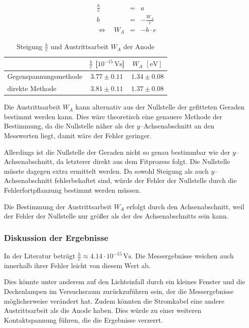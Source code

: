 \documentclass[12pt,a4paper]{scrartcl}
\numberwithin{equation}{section} %
\begin{document}
\begin{eqnarray}
	\frac{h}{e} &=& a \label{eq:h/e Steigung} \\
	b &=& - \frac{W_A}{e} \label{eq:h/e Achsenabschnitt} \\
	\Leftrightarrow \quad W_A &=& - b \cdot e
\end{eqnarray}

\begin{table}[h!]
	\centering
	\begin{tabular}{l|c|c}
		& $\frac{h}{e}$ [$10^{-15} \mathrm{\, Vs}$] & $W_A$ $[\mathrm{eV}]$ \\
		\hline
		Gegenspannungsmethode & $3.77 \pm 0.11$ & $1.34 \pm 0.08$ \\
		direkte Methode & $3.81 \pm 0.11$ & $1.37 \pm 0.08$
	\end{tabular}
	\caption{Steigung $\frac{h}{e}$ und Austrittsarbeit $W_A$ der Anode}
	\label{table:Ergebnisse Energie}
\end{table}

\noindent
Die Austrittsarbeit $W_A$ kann alternativ aus der Nullstelle der gefitteten Geraden bestimmt werden kann. Dies wäre theoretisch eine genauere Methode der Bestimmung, da die Nullstelle näher als der $y$--Achsenabschnitt an den Messwerten liegt, damit wäre der Fehler geringer.

Allerdings ist die Nullstelle der Geraden nicht so genau bestimmbar wie der $y$--Achsenabschnitt, da letzterer direkt aus dem Fitprozess folgt. Die Nullstelle müsste dagegen extra ermittelt werden. Da sowohl Steigung als auch $y$--Achsenabschnitt fehlerbehaftet sind, würde der Fehler der Nullstelle durch die Fehlerfortpflanzung bestimmt werden müssen.

Die Bestimmung der Austrittsarbeit $W_A$ erfolgt durch den Achsenabschnitt, weil der Fehler der Nullstelle nur größer als der des Achsenabschnitts sein kann.

\subsubsection{Diskussion der Ergebnisse}
In der Literatur beträgt $\frac{h}{e}\approx4.14 \cdot 10^{-15} \mathrm{\, Vs}$. \cite{Gerthsen} Die Messergebnisse weichen auch innerhalb ihrer Fehler leicht von diesem Wert ab.

Dies könnte unter anderem auf den Lichteinfall durch ein kleines Fenster und die Deckenlampen im Versuchsraum zurückzuführen sein, der die Messergebnisse möglicherweise verändert hat. Zudem könnten die Stromkabel eine andere Austrittsarbeit als die Anode haben. Dies würde zu einer weiteren Kontaktspannung führen, die die Ergebnisse verzerrt.
\end{document}
